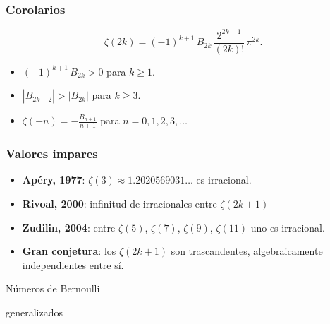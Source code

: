 \documentclass[handout]{beamer}
\begin{document}

\begin{frame}
  \frametitle{Corolarios}

  \[ \zeta (2k) = (-1)^{k+1} \, B_{2k}\,\frac{2^{2k-1}}{(2k)!}\,\pi^{2k}. \]

  \begin{itemize}
  \item<2-> $(-1)^{k+1}\,B_{2k} > 0$ para $k \ge 1$.

  \item<3-> $|B_{2k+2}| > |B_{2k}|$ para $k \ge 3$.

  \item<4-> $\zeta (-n) = -\frac{B_{n+1}}{n+1}$ para $n = 0,1,2,3,\ldots$
  \end{itemize}
\end{frame}


\begin{frame}
  \frametitle{Valores impares}

  \begin{itemize}
  \item<1-> \textbf{Apéry, 1977}:
    $\zeta (3) \approx 1.2020569031\ldots$
    es irracional.

  \item<2-> \textbf{Rivoal, 2000}:
    infinitud de irracionales entre $\zeta (2k+1)$

  \item<3-> \textbf{Zudilin, 2004}:
    entre $\zeta(5)$, $\zeta(7)$, $\zeta(9)$, $\zeta(11)$ uno es irracional.

  \item<4-> \textbf{Gran conjetura}: los $\zeta (2k+1)$ son trascandentes,
    algebraicamente independientes entre sí.
  \end{itemize}
\end{frame}


\begin{frame}[plain]
  \headingfont

  \begin{center}
    {\huge Números de Bernoulli

      generalizados

    }
  \end{center}
\end{frame}
\end{document}
